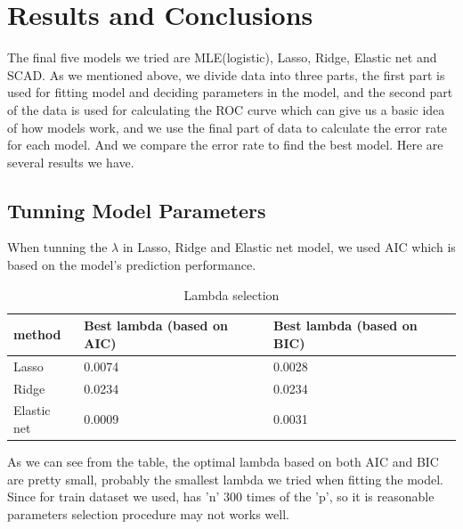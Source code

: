\documentclass[paper=a4, fontsize=11pt]{scrartcl} %
\numberwithin{equation}{section} %
\numberwithin{figure}{section} %
\numberwithin{table}{section} %
\begin{document}
\section{Results and Conclusions}
The final five models we tried are MLE(logistic), Lasso, Ridge, Elastic net and SCAD. As we mentioned above, we divide data into three parts, the first part is used for fitting model and deciding parameters in the model, and the second part of the data is used for calculating the ROC curve which can give us a basic idea of how models work, and we use the final part of data to calculate the error rate for each model. And we compare the error rate to find the best model.
Here are several results we have.
\subsection{Tunning Model Parameters}
When tunning the $\lambda$ in Lasso, Ridge and Elastic net model, we used AIC which is based on the model's prediction performance.
\begin{table}[!ht]
\centering
\caption{Lambda selection}
\label{fig:1}
\begin{tabular}{lll}\hline
method      & Best lambda (based on AIC) & Best lambda (based on BIC) \\\hline
Lasso       & 0.0074                     & 0.0028                     \\
Ridge       & 0.0234                     & 0.0234                     \\
Elastic net & 0.0009                     & 0.0031                  \\\hline  
\end{tabular}
\end{table}
As we can see from the table, the optimal lambda based on both AIC and BIC are pretty small, probably the smallest lambda we tried when fitting the model. Since for train dataset we used, has 'n' 300 times of the 'p', so it is reasonable parameters selection procedure may not works well. 
\end{document}
